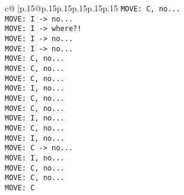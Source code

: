 \documentclass{article}
\begin{document}
{\begin{supertabular}{c@{$\;$}|p{.15\linewidth}@{}p{.15\linewidth}p{.15\linewidth}p{.15\linewidth}p{.15\linewidth}p{.15\linewidth}}
{{{ \tt  MOVE: C, no...\\ \tt  MOVE: I -> no...\\ \tt  MOVE: I -> where?!\\ \tt  MOVE: I -> no...\\ \tt  MOVE: I -> no...\\ \tt  MOVE: C, no...\\ \tt  MOVE: C, no...\\ \tt  MOVE: C, no...\\ \tt  MOVE: I, no...\\ \tt  MOVE: C, no...\\ \tt  MOVE: C, no...\\ \tt  MOVE: I, no...\\ \tt  MOVE: C, no...\\ \tt  MOVE: I, no...\\ \tt  MOVE: C -> no...\\ \tt  MOVE: I, no...\\ \tt  MOVE: C, no...\\ \tt  MOVE: C, no...\\ \tt  MOVE: C}}}
\end{supertabular}}
\end{document}
